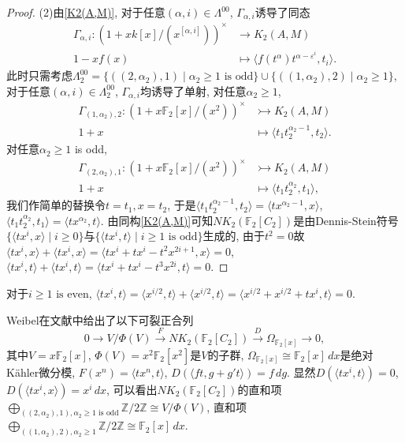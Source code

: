 \begin{proof}
	(2)由\ref{K2(A,M)}, 对于任意$(\alpha,i)\in \Lambda^{00}$, $\Gamma_{\alpha,i}$诱导了同态
 \begin{align*}
 \Gamma_{\alpha,i} \colon (1+xk[x]/(x^{[\alpha,i]}))^{\times} &\longrightarrow K_2(A,M)\\
 1-xf(x) &\mapsto \langle f(t^\alpha)t^{\alpha-\varepsilon^i},t_i \rangle.
 \end{align*}
 此时只需考虑$\Lambda^{00}_2=\{((2,\alpha_2),1)\mid  \alpha_2\geq 1\text{ is odd}\} \cup \{((1,\alpha_2),2)\mid  \alpha_2\geq 1\}$, 对于任意$(\alpha,i)\in \Lambda^{00}_2$, $\Gamma_{\alpha,i}$均诱导了单射, 对任意$\alpha_2\geq 1$, 
  \begin{align*}
 \Gamma_{(1,\alpha_2),2} \colon (1+x \mathbb{F}_2[x]/(x^{2}))^{\times} &\rightarrowtail K_2(A,M)\\
 1+x &\mapsto %
 \langle t_1t_2^{\alpha_2-1},t_2 \rangle.
 \end{align*}
对任意$\alpha_2\geq 1$ is odd, 
 \begin{align*}
 \Gamma_{(2,\alpha_2),1} \colon (1+x \mathbb{F}_2[x]/(x^{2}))^{\times} &\rightarrowtail K_2(A,M)\\
 1+x &\mapsto \langle t_1t_2^{\alpha_2},t_1 \rangle,
 \end{align*}
我们作简单的替换令$t=t_1, x=t_2$, 于是$\langle t_1t_2^{\alpha_2-1},t_2 \rangle = \langle tx^{\alpha_2-1},x \rangle$, $\langle t_1t_2^{\alpha_2},t_1 \rangle=\langle t x^{\alpha_2},t  \rangle$. 由同构\ref{K2(A,M)}可知$NK_2(\mathbb{F}_2[C_2])$是由Dennis-Stein符号$\{\langle tx^i,x \rangle \mid i\geq 0\}$与$\{\langle tx^i,t \rangle \mid i\geq 1\text{ is odd}\}$生成的, 由于$t^2=0$故$\langle tx^i,x \rangle+\langle tx^i,x \rangle=\langle tx^i+tx^i-t^2x^{2i+1},x \rangle=0$, $\langle tx^i,t \rangle+\langle tx^i,t \rangle=\langle tx^i+tx^i-t^3x^{2i},t \rangle=0$. 
\end{proof}
\begin{remark}
	对于$i\geq 1\text{ is even}$, $\langle tx^i,t \rangle=\langle x^{i/2},t \rangle+\langle x^{i/2},t \rangle=\langle x^{i/2}+x^{i/2}+tx^i,t \rangle=0$. 
\end{remark}

Weibel在文献\cite{weibel2009nk0}中给出了以下可裂正合列
	\[0\longrightarrow V/\Phi(V) \overset{F}\longrightarrow NK_2(\mathbb{F}_2[C_2])\overset{D}\longrightarrow \Omega_{\mathbb{F}_2[x]}\longrightarrow 0,\]
其中$V=x \mathbb{F}_2[x]$, $\Phi(V)=x^2 \mathbb{F}_2[x^2]$是$V$的子群, $\Omega_{\mathbb{F}_2[x]}\cong \mathbb{F}_2[x]\,d x$是绝对K\"{a}hler微分模, $F(x^n)=\langle tx^n,t \rangle$, $D(\langle ft,g+g't \rangle)=f\,dg$. 显然$D(\langle tx^i,t \rangle)=0$, $D(\langle tx^i,x \rangle)=x^i\, dx$, 可以看出$NK_2(\mathbb{F}_2[C_2])$的直和项$\bigoplus_{((2,\alpha_2),1), \alpha_2\geq 1\text{ is odd}} \mathbb{Z}/2\mathbb{Z} \cong V/\Phi(V)$, 直和项$\bigoplus_{((1,\alpha_2),2), \alpha_2\geq 1} \mathbb{Z}/2\mathbb{Z} \cong \mathbb{F}_2[x]\,d x$. 

